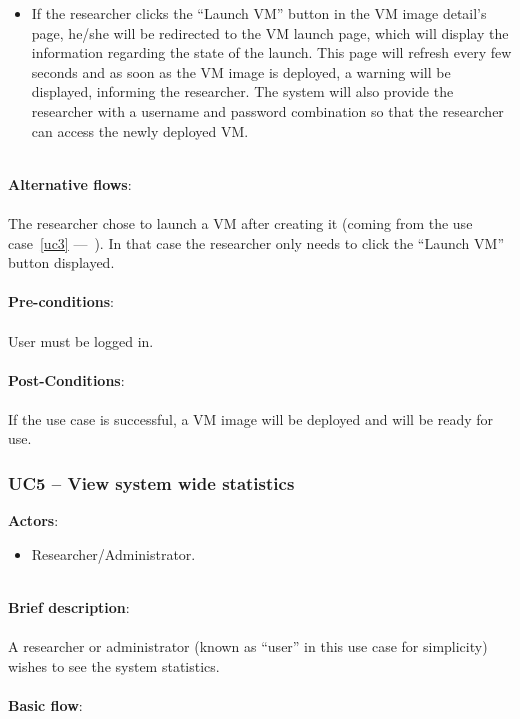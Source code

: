 \begin{itemize}
\begin{itemize}
	\end{itemize}
\item If the researcher clicks the ``Launch VM'' button in the VM image detail's page, he/she will be redirected to the VM launch page, which will display the information regarding the state of the launch. This page will refresh every few seconds and as soon as the VM image is deployed, a warning will be displayed, informing the researcher. The system will also provide the researcher with a username and password combination so that the researcher can access the newly deployed VM.
\end{itemize}

\ \\
\textbf{Alternative flows}:\\
\ \\
The researcher chose to launch a VM after creating it (coming from the use case~\ref{uc3} ---~). In that case the researcher only needs to click the ``Launch VM'' button displayed.\\
\ \\
\textbf{Pre-conditions}:\\
\ \\
User must be logged in.\\
\ \\
\textbf{Post-Conditions}:\\
\ \\
If the use case is successful, a VM image will be deployed and will be ready for use.


\subsubsection{UC5 -- View system wide statistics}\label{uc5}

\textbf{Actors}:

\begin{itemize}
\item Researcher/Administrator.
\end{itemize}

\ \\
\textbf{Brief description}:\\
\ \\
A researcher or administrator (known as ``user'' in this use case for simplicity) wishes to see the system statistics.\\
\ \\
\textbf{Basic flow}:

